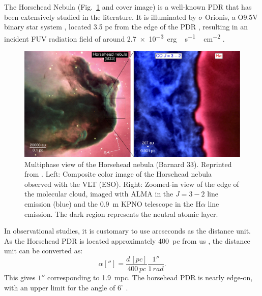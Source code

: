 \documentclass[12pt,a4paper]{article}
\begin{document}

The Horsehead Nebula (Fig.~\ref{fig:obsimg} and cover image) is a well-known PDR that has been extensively studied in the literature. It is illuminated by $\sigma$ Orionis, a O9.5V binary star system \parencite{Warren1977}, located 3.5 pc from the edge of the PDR \parencite{Abergel2003,Schirmer2020}, resulting in an incident FUV radiation field of around \qty{2.7e-3}{erg\,\second^{-1}\,\centi\metre^{-2}} \parencite{Habart2005}. 

\begin{figure}[ht]
    \centering
    \includegraphics[width=\textwidth,keepaspectratio]{horsehead_HernandezVera2023.pdf}
    \caption{Multiphase view of the Horsehead nebula (Barnard 33). Reprinted from \textcite{HernándezVera2023}. Left: Composite color image of the Horsehead nebula observed with the VLT (ESO). Right: Zoomed-in view of the edge of the molecular cloud, imaged with ALMA in the  $J = 3-2$ line emission (blue) and the \qty{0.9}{m} KPNO telescope in the H$\alpha$ line emission. The dark region represents the neutral atomic layer.} \label{fig:obsimg}
\end{figure}

In observational studies, it is customary to use arcseconds as the distance unit. As the Horsehead PDR is located approximately \qty{400}{pc} from us \parencite{Menten2007, Schlafly2014}, the distance unit can be converted as:
\begin{equation}
    \alpha[''] = \frac{d\,[\unit{pc}]}{400\,\unit{pc}} \frac{1''}{1\,\unit{rad}}.
\end{equation}
This gives \(1''\) corresponding to \qty{1.9}{mpc}. The horsehead PDR is nearly edge-on, with an upper limit for the angle of $6^\circ$ \parencite{Habart2005}.
\end{document}
